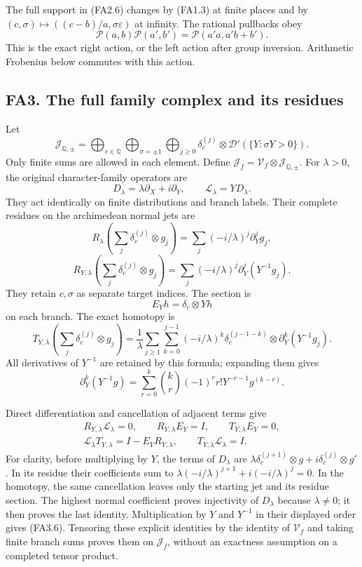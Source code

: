 The full support in (FA2.6) changes by (FA1.3) at finite places and by
\((c,\sigma)\mapsto((c-b)/a,\sigma\varepsilon)\) at infinity. The
rational pullbacks obey \[
 \mathcal P(a,b)\mathcal P(a',b')
   =\mathcal P(a'a,a'b+b').
\tag{FA2.7}
\] This is the exact right action, or the left action after group
inversion. Arithmetic Frobenius below commutes with this action.

\subsection{FA3. The full family complex and its
residues}\label{fa3.-the-full-family-complex-and-its-residues}

Let \[
 \mathcal J_{\mathbb Q,\pm}
  =\bigoplus_{c\in\mathbb Q}\bigoplus_{\sigma=\pm1}
      \bigoplus_{j\ge0}
        \delta_c^{(j)}\otimes
        \mathcal D'(\{Y:\sigma Y>0\}).
\tag{FA3.1}
\] Only finite sums are allowed in each element. Define
\(\mathcal J_f=\mathscr V_f\otimes\mathcal J_{\mathbb Q,\pm}\). For
\(\lambda>0\), the original character-family operators are \[
 D_\lambda=\lambda\partial_X+i\partial_Y,\qquad
 \mathcal L_\lambda=Y D_\lambda.
\tag{FA3.2}
\] They act identically on finite distributions and branch labels. Their
complete residues on the archimedean normal jets are \[
 R_\lambda\!\left(\sum_j\delta_c^{(j)}\otimes g_j\right)
     =\sum_j(-i/\lambda)^j\partial_Y^jg_j,
\] \[
 R_{Y,\lambda}\!\left(\sum_j\delta_c^{(j)}\otimes g_j\right)
     =\sum_j(-i/\lambda)^j
                         \partial_Y^j(Y^{-1}g_j).
\tag{FA3.3}
\] They retain \(c,\sigma\) as separate target indices. The section is
\[
 E_Yh=\delta_c\otimes Yh
\tag{FA3.4}
\] on each branch. The exact homotopy is \[
 T_{Y,\lambda}
   \left(\sum_j\delta_c^{(j)}\otimes g_j\right)
   =\frac1\lambda\sum_{j\ge1}\sum_{k=0}^{j-1}
       (-i/\lambda)^k\delta_c^{(j-1-k)}
                   \otimes\partial_Y^k(Y^{-1}g_j).
\tag{FA3.5}
\] All derivatives of \(Y^{-1}\) are retained by this formula; expanding
them gives \[
\partial_Y^k(Y^{-1}g)
=\sum_{r=0}^k\binom kr(-1)^r r!
       Y^{-r-1}g^{(k-r)}.
\]

Direct differentiation and cancellation of adjacent terms give \[
 \begin{gathered}
 R_{Y,\lambda}\mathcal L_\lambda=0,\qquad
 R_{Y,\lambda}E_Y=I,\qquad T_{Y,\lambda}E_Y=0,\\
 \mathcal L_\lambda T_{Y,\lambda}
       =I-E_YR_{Y,\lambda},\qquad
 T_{Y,\lambda}\mathcal L_\lambda=I.
 \end{gathered}
\tag{FA3.6}
\] For clarity, before multiplying by \(Y\), the terms of \(D_\lambda\)
are \(\lambda\delta_c^{(j+1)}\otimes g+
i\delta_c^{(j)}\otimes g'\). In its residue their coefficients sum to
\(\lambda(-i/\lambda)^{j+1}+i(-i/\lambda)^j=0\). In the homotopy, the
same cancellation leaves only the starting jet and its residue section.
The highest normal coefficient proves injectivity of \(D_\lambda\)
because \(\lambda\ne0\); it then proves the last identity.
Multiplication by \(Y\) and \(Y^{-1}\) in their displayed order gives
(FA3.6). Tensoring these explicit identities by the identity of
\(\mathscr V_f\) and taking finite branch sums proves them on
\(\mathcal J_f\), without an exactness assumption on a completed tensor
product.

